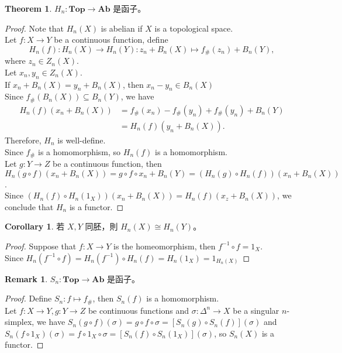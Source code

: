 \documentclass[12pt]{article}
\theoremstyle{definition}
\newtheorem{theorem}[definition]{Theorem}
\newtheorem{remark}[definition]{Remark}
\newtheorem{corollary}[definition]{Corollary}
\newcommand\<{\langle}
\renewcommand\>{\rangle}
\begin{document}
\begin{CJK}{UTF8}{bsmi}
\begin{theorem}
    $H_n:\textbf{Top}\to\textbf{Ab}$ 是函子。
\end{theorem}
\begin{proof}
    Note that $H_n(X)$ is abelian if $X$ is a topological space. \\
    Let $f:X\to Y$ be a continuous function, define 
    \[
        H_n(f):H_n(X)\to H_n(Y):z_n+B_n(X)\mapsto f_\#(z_n)+B_n(Y),
    \]
    where $z_n\in Z_n(X)$. \\
    Let $x_n, y_n\in Z_n(X)$. \\ 
    If $x_n+B_n(X)=y_n+B_n(X)$, then $x_n-y_n\in B_n(X)$ \\
    Since $f_\#(B_n(X))\subseteq B_n(Y)$, we have
    \begin{align*}
        H_n(f)(x_n+B_n(X))
        & = f_\#(x_n)-f_\#(y_n)+f_\#(y_n)+B_n(Y) \\
        & = H_n(f)(y_n+B_n(X)).
    \end{align*}
    Therefore, $H_n$ is well-define. \\
    Since $f_\#$ is a homomorphism, so $H_n(f)$ is a homomorphism. \\
    Let $g:Y\to Z$ be a continuous function, then $H_n(g\circ f)(x_n+B_n(X))=g\circ f\circ x_n+B_n(Y)=(H_n(g)\circ H_n(f))(x_n+B_n(X))$. \\
    Since $(H_n(f)\circ H_n(1_X))(x_n+B_n(X))=H_n(f)(x_z+B_n(X))$, we conclude that $H_n$ is a functor.
\end{proof}

\begin{corollary}
    若 $X, Y$ 同胚，則 $H_n(X)\cong H_n(Y)$。
\end{corollary}
\begin{proof}
    Suppose that $f:X\to Y$ is the homeomorphism, then $f^{-1}\circ f=1_X$. \\
    Since $H_n(f^{-1}\circ f)=H_n(f^{-1})\circ H_n(f)=H_n(1_X)=1_{H_n(X)}$
\end{proof}

\begin{remark}
    $S_n:\textbf{Top}\to\textbf{Ab}$ 是函子。
\end{remark}
\begin{proof}
    Define $S_n:f\mapsto f_\#$, then $S_n(f)$ is a homomorphism. \\
    Let $f:X\to Y, g:Y\to Z$ be continuous functions and $\sigma:\Delta^n\to X$ be a singular $n$-simplex, we have $S_n(g\circ f)(\sigma)=g\circ f\circ\sigma=[S_n(g)\circ S_n(f)](\sigma)$ and $S_n(f\circ 1_X)(\sigma)=f\circ 1_X\circ\sigma=[S_n(f)\circ S_n(1_X)](\sigma)$, so $S_n(X)$ is a functor.
\end{proof}


\end{CJK}
\end{document}
